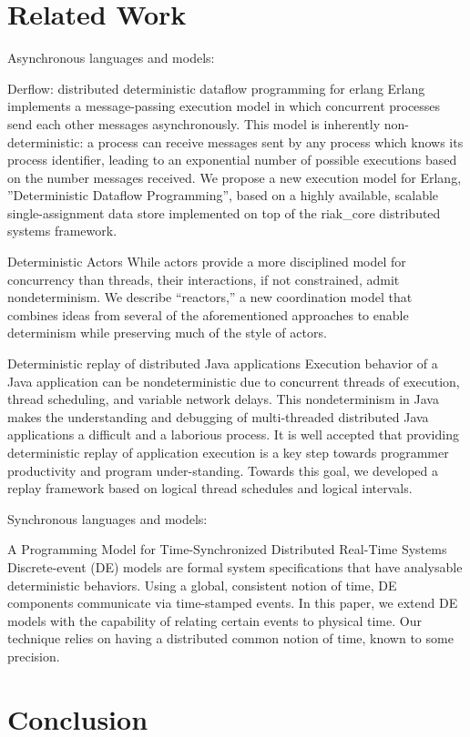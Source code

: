 \documentclass[sigplan,screen]{acmart}
\begin{document}
\section{Related Work}

Asynchronous languages and models:

Derflow: distributed deterministic dataflow programming for erlang
Erlang implements a message-passing execution model in which concurrent processes send each other messages asynchronously. This model is inherently non-deterministic: a process can receive messages sent by any process which knows its process identifier, leading to an exponential number of possible executions based on the number messages received. 
We propose a new execution model for Erlang, ''Deterministic Dataflow Programming'', based on a highly available, scalable single-assignment data store implemented on top of the riak\_core distributed systems framework.

Deterministic Actors
While actors provide a more disciplined model for concurrency than threads, their interactions, if not constrained, admit nondeterminism.
 We describe “reactors,” a new coordination model that combines ideas from several of the aforementioned approaches to enable determinism while preserving much of the style of actors.

Deterministic replay of distributed Java applications
Execution behavior of a Java application can be nondeterministic due to concurrent threads of execution, thread scheduling, and variable network delays. This nondeterminism in Java makes the understanding and debugging of multi-threaded distributed Java applications a difficult and a laborious process.
It is well accepted that providing deterministic replay of application execution is a key step towards programmer productivity and program under-standing.
Towards this goal, we developed a replay framework based on logical thread schedules and logical intervals.

Synchronous languages and models:

A Programming Model for Time-Synchronized Distributed Real-Time Systems
Discrete-event (DE) models are formal system specifications that have analysable deterministic behaviors. Using a global, consistent notion of time, DE components communicate via time-stamped events.
In this paper, we extend DE models with the capability of relating certain events to physical time.
Our technique relies on having a distributed common notion of time, known to some precision.




\section{Conclusion}



\end{document}
